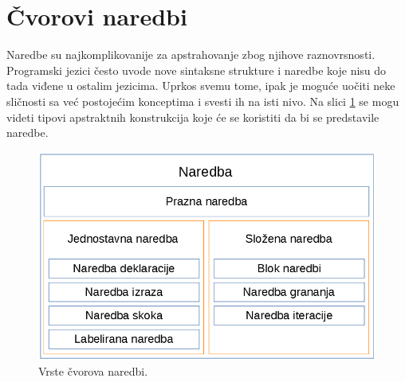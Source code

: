 \section{Čvorovi naredbi}
\label{sec:MyASTStatementNodes}

Naredbe su najkomplikovanije za apstrahovanje zbog njihove raznovrsnosti. Programski jezici često uvode nove sintaksne strukture i naredbe koje nisu do tada viđene u ostalim jezicima. Uprkos svemu tome, ipak je moguće uočiti neke sličnosti sa već postojećim konceptima i svesti ih na isti nivo. Na slici \ref{fig:StatementNodes} se mogu videti tipovi apstraktnih konstrukcija koje će se koristiti da bi se predstavile naredbe.

\begin{figure}[h!]
    \centering
        \includegraphics[scale=0.7]{images/statement_nodes.png}
    \caption{Vrste čvorova naredbi.}
    \label{fig:StatementNodes}
\end{figure}

